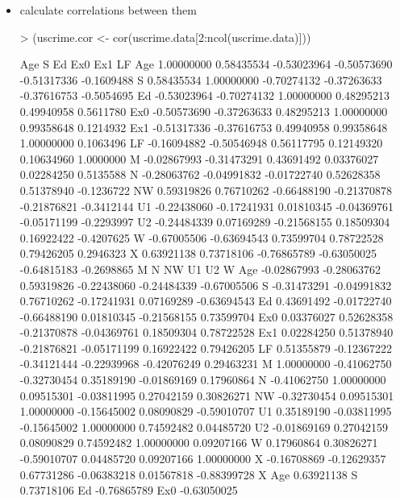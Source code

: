 \documentclass[a4paper]{article}
\begin{document}
\begin{itemize}
\begin{itemize}
\begin{figure}[H]
\end{figure}
\item calculate correlations between them
\begin{Schunk}
\begin{Sinput}
> (uscrime.cor <- cor(uscrime.data[2:ncol(uscrime.data)]))
\end{Sinput}
\begin{Soutput}
            Age           S          Ed         Ex0         Ex1         LF
Age  1.00000000  0.58435534 -0.53023964 -0.50573690 -0.51317336 -0.1609488
S    0.58435534  1.00000000 -0.70274132 -0.37263633 -0.37616753 -0.5054695
Ed  -0.53023964 -0.70274132  1.00000000  0.48295213  0.49940958  0.5611780
Ex0 -0.50573690 -0.37263633  0.48295213  1.00000000  0.99358648  0.1214932
Ex1 -0.51317336 -0.37616753  0.49940958  0.99358648  1.00000000  0.1063496
LF  -0.16094882 -0.50546948  0.56117795  0.12149320  0.10634960  1.0000000
M   -0.02867993 -0.31473291  0.43691492  0.03376027  0.02284250  0.5135588
N   -0.28063762 -0.04991832 -0.01722740  0.52628358  0.51378940 -0.1236722
NW   0.59319826  0.76710262 -0.66488190 -0.21370878 -0.21876821 -0.3412144
U1  -0.22438060 -0.17241931  0.01810345 -0.04369761 -0.05171199 -0.2293997
U2  -0.24484339  0.07169289 -0.21568155  0.18509304  0.16922422 -0.4207625
W   -0.67005506 -0.63694543  0.73599704  0.78722528  0.79426205  0.2946323
X    0.63921138  0.73718106 -0.76865789 -0.63050025 -0.64815183 -0.2698865
              M           N          NW          U1          U2           W
Age -0.02867993 -0.28063762  0.59319826 -0.22438060 -0.24484339 -0.67005506
S   -0.31473291 -0.04991832  0.76710262 -0.17241931  0.07169289 -0.63694543
Ed   0.43691492 -0.01722740 -0.66488190  0.01810345 -0.21568155  0.73599704
Ex0  0.03376027  0.52628358 -0.21370878 -0.04369761  0.18509304  0.78722528
Ex1  0.02284250  0.51378940 -0.21876821 -0.05171199  0.16922422  0.79426205
LF   0.51355879 -0.12367222 -0.34121444 -0.22939968 -0.42076249  0.29463231
M    1.00000000 -0.41062750 -0.32730454  0.35189190 -0.01869169  0.17960864
N   -0.41062750  1.00000000  0.09515301 -0.03811995  0.27042159  0.30826271
NW  -0.32730454  0.09515301  1.00000000 -0.15645002  0.08090829 -0.59010707
U1   0.35189190 -0.03811995 -0.15645002  1.00000000  0.74592482  0.04485720
U2  -0.01869169  0.27042159  0.08090829  0.74592482  1.00000000  0.09207166
W    0.17960864  0.30826271 -0.59010707  0.04485720  0.09207166  1.00000000
X   -0.16708869 -0.12629357  0.67731286 -0.06383218  0.01567818 -0.88399728
              X
Age  0.63921138
S    0.73718106
Ed  -0.76865789
Ex0 -0.63050025

\end{Soutput}
\end{Schunk}
\end{itemize}
\end{itemize}
\end{document}

